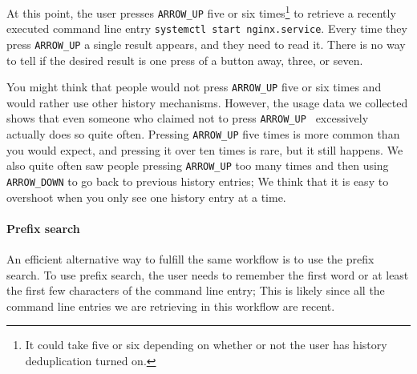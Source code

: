 At this point, the user presses \verb|ARROW_UP| five or six times\footnote{It could take five or six depending on whether or not the user has history deduplication turned on.} to retrieve a recently executed command line entry \verb|systemctl start nginx.service|. Every time they press \verb|ARROW_UP| a single result appears, and they need to read it. There is no way to tell if the desired result is one press of a button away, three, or seven. %



You might think that people would not press \verb|ARROW_UP| five or six times and would rather use other history mechanisms.
However, the usage data we collected shows that even someone who claimed not to press \verb|ARROW_UP | excessively actually does so quite often. Pressing \verb|ARROW_UP| five times is more common than you would expect, and pressing it over ten times is rare, but it still happens. We also quite often saw people pressing \verb|ARROW_UP| too many times and then using \verb|ARROW_DOWN| to go back to previous history entries; We think that it is easy to overshoot when you only see one history entry at a time.




\paragraph{Prefix search}

An efficient alternative way to fulfill the same workflow is to use the prefix search. To use prefix search, the user needs to remember the first word or at least the first few characters of the command line entry; This is likely since all the command line entries we are retrieving in this workflow are recent.

